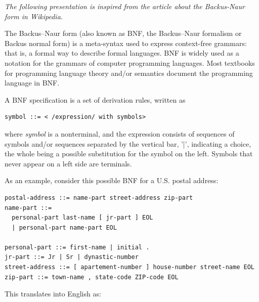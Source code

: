 \documentclass[11pt]{article}
\begin{document}
\emph{The following presentation is inspired from the article about the
Backus-Naur form in Wikipedia.}

The Backus--Naur form (also known as BNF, the Backus--Naur formalism or
Backus normal form) is a meta-syntax used to express context-free
grammars: that is, a formal way to describe formal languages. BNF is
widely used as a notation for the grammars of computer programming
languages. Most textbooks for programming language theory and/or
semantics document the programming language in BNF.

A BNF specification is a set of derivation rules, written as

\lstset{language=[LaTeX]TeX,label= ,caption= ,captionpos=b,numbers=none}
\begin{lstlisting}
symbol ::= < /expression/ with symbols>
\end{lstlisting}

where \emph{symbol} is a nonterminal, and the expression consists of
sequences of symbols and/or sequences separated by the vertical bar,
'|', indicating a choice, the whole being a possible substitution for
the symbol on the left. Symbols that never appear on a left side are
terminals.

As an example, consider this possible BNF for a U.S. postal address:

\lstset{language=[LaTeX]TeX,label= ,caption= ,captionpos=b,numbers=none}
\begin{lstlisting}
postal-address ::= name-part street-address zip-part
name-part ::=
  personal-part last-name [ jr-part ] EOL 
  | personal-part name-part EOL

personal-part ::= first-name | initial .
jr-part ::= Jr | Sr | dynastic-number
street-address ::= [ apartement-number ] house-number street-name EOL
zip-part ::= town-name , state-code ZIP-code EOL
\end{lstlisting}

This translates into English as:
\end{document}

